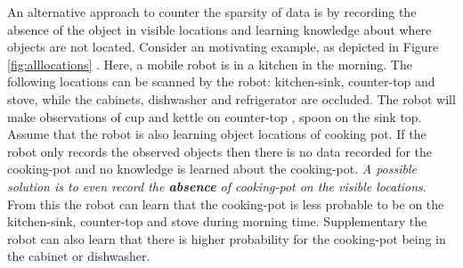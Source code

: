 An alternative approach to counter the sparsity of data is by recording the absence of the object in visible locations and learning knowledge about where objects are not located. Consider an motivating example, as depicted in Figure \ref{fig:alllocations} . Here, a mobile robot is in a kitchen in the morning. The following locations can be scanned by the robot: kitchen-sink, counter-top and stove, while the cabinets, dishwasher and refrigerator are occluded. The robot will make observations of cup and kettle on counter-top , spoon on the sink top. Assume that the robot is also learning object locations of cooking pot. If the robot only records the observed objects then there is no data recorded for the cooking-pot and no knowledge is learned about the cooking-pot. \emph{A possible solution is to even record the \textbf{absence} of cooking-pot on the visible locations}. From this the robot can learn that the cooking-pot is less probable to be on the kitchen-sink, counter-top and stove during morning time. Supplementary the robot can also learn that there is higher probability for the cooking-pot being in the cabinet or dishwasher.


